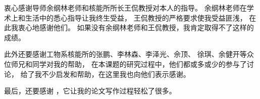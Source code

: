 

\begin{ack}
  衷心感谢导师余纲林老师和核能所所长王侃教授对本人的指导。
  余纲林老师在学术上和生活中的悉心指导让我终生受益，
  王侃教授的严格要求使我受益匪浅，
  在此我衷心地感谢他们。
  如果没有余纲林老师和王侃教授，我肯定取得不了这样的成绩。
  
  此外还要感谢工物系核能所的张鹏、李林森、李泽光、佘顶、
  徐琪、余健开等众位师兄和同学对我的帮助，
  在本课题的研究过程中，他们都或多或少的参与了讨论，
  给了我不少启发和帮助，在这里我也向他们表示感谢。
  
  最后，还要感谢 \thuthesis，它让我的论文写作过程轻松了很多。

\end{ack}
